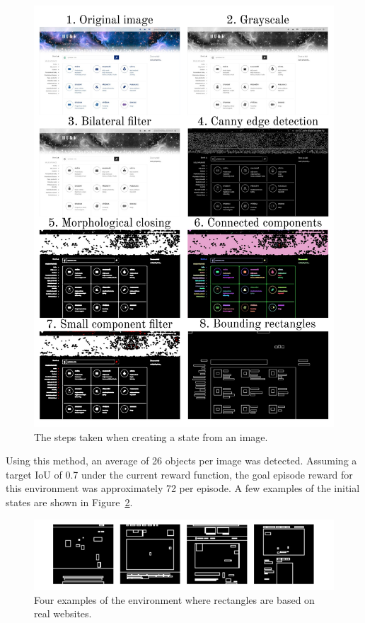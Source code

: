 \documentclass[
  digital,     %
  oneside,     %
  nosansbold,  %
  nocolorbold, %
  lof,         %
  lot,         %
]{fithesis4}
\begin{document}
\begin{figure}
    \centering
    \includegraphics[width=1\linewidth]{diagrams/simple_detector.pdf}
    \caption{The steps taken when creating a state from an image.}
    \label{fig:simple-detector}
\end{figure}

Using this method, an average of 26 objects per image was detected. Assuming a target IoU of 0.7 under the current reward function, the goal episode reward for this environment was approximately 72 per episode. A few examples of the initial states are shown in Figure~\ref{fig:env8}.

\begin{figure}
    \centering
    \includegraphics[width=1\linewidth]{env_examples/env8.pdf}
    \caption{Four examples of the environment where rectangles are based on real websites.}
    \label{fig:env8}
\end{figure}
\end{document}
